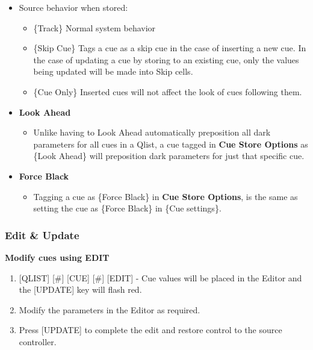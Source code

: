 \documentclass[
]{article}
\providecommand{\tightlist}{%
  \setlength{\itemsep}{0pt}\setlength{\parskip}{0pt}}
\begin{document}
\begin{itemize}
  \begin{itemize}
  \tightlist
  \item
    \{Show Filters\} Opens user prebuilt filters in the popup.
  \end{itemize}
\item
  Source behavior when stored:

  \begin{itemize}
  \item
    \{Track\} Normal system behavior
  \item
    \{Skip Cue\} Tags a cue as a skip cue in the case of inserting a new cue. In the case of updating a cue by storing to an existing cue, only the values being updated will be made into Skip cells.
  \item
    \{Cue Only\} Inserted cues will not affect the look of cues following them.
  \end{itemize}
\item
  \textbf{Look Ahead}

  \begin{itemize}
  \tightlist
  \item
    Unlike having to Look Ahead automatically preposition all dark parameters for all cues in a Qlist, a cue tagged in \textbf{Cue Store Options} as \{Look Ahead\} will preposition dark parameters for just that specific cue.
  \end{itemize}
\item
  \textbf{Force Black}

  \begin{itemize}
  \tightlist
  \item
    Tagging a cue as \{Force Black\} in \textbf{Cue Store Options}, is the same as setting the cue as \{Force Black\} in \{Cue settings\}.
  \end{itemize}
\end{itemize}

\hypertarget{edit-update}{%
\subsubsection{Edit \& Update}\label{edit-update}}

\textbf{Modify cues using EDIT}

\begin{enumerate}
\def\labelenumi{\arabic{enumi}.}
\item
  {[}QLIST{]} {[}\#{]} {[}CUE{]} {[}\#{]} {[}EDIT{]} - Cue values will be placed in the Editor and the {[}UPDATE{]} key will flash red.
\item
  Modify the parameters in the Editor as required.
\item
  Press {[}UPDATE{]} to complete the edit and restore control to the source controller.
\end{enumerate}
\end{document}
